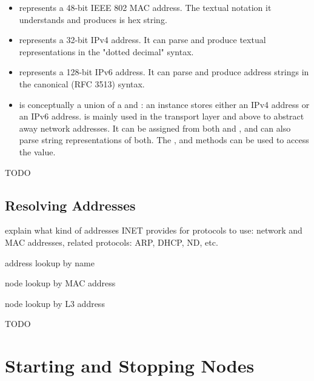 \begin{itemize}
  \item {} represents a 48-bit IEEE 802 MAC address. The
    textual notation it understands and produces is hex string.

  \item {} represents a 32-bit IPv4 address. It can parse
    and produce textual representations in the "dotted decimal" syntax.

  \item {} represents a 128-bit IPv6 address. It can parse
    and produce address strings in the canonical (RFC 3513) syntax.

  \item {} is conceptually a union of a 
    and : an instance stores either an IPv4 address or an
    IPv6 address.  is mainly used in the transport layer and above
    to abstract away network addresses. It can be assigned from both 
    and , and can also parse string representations of both.
    The ,  and  methods can be used
    to access the value.
\end{itemize}

 TODO
\subsection{Resolving Addresses}

explain what kind of addresses INET provides for protocols to use: network
and MAC addresses, related protocols: ARP, DHCP, ND, etc.

address lookup by name

node lookup by MAC address

node lookup by L3 address


 TODO
\section{Starting and Stopping Nodes}



\fi


%